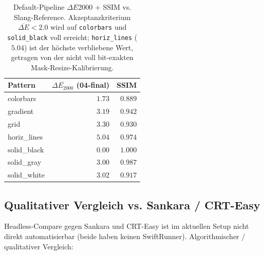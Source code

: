 \documentclass[11pt, a4paper]{article}
\newcommand{\tableheadercolor}{\rowcolor{hkared}}
\newcommand{\thw}[1]{\color{white}\textbf{#1}}  %
\begin{document}
\vspace{.25cm}
\begin{table}[H]
\centering
\small
{}
\begin{tabularx}{\textwidth}{Xrr}
    \toprule
    \tableheadercolor \thw{Pattern} & \thw{$\overline{\Delta E_{2000}}$ (04-final)} & \thw{SSIM} \\
    \midrule
    colorbars   & $1.73$ & $0.889$ \\
    gradient    & $3.19$ & $0.942$ \\
    grid        & $3.30$ & $0.930$ \\
    horiz\_lines & $5.04$ & $0.974$ \\
    solid\_black & $0.00$ & $1.000$ \\
    solid\_gray  & $3.00$ & $0.987$ \\
    solid\_white & $3.02$ & $0.917$ \\
    \bottomrule
\end{tabularx}
 \vspace{.25cm}
\caption{Default-Pipeline $\Delta E$2000 + SSIM vs. Slang-Reference. Akzeptanzkriterium $\overline{\Delta E} < 2.0$ wird auf \texttt{colorbars} und \texttt{solid\_black} voll erreicht; \texttt{horiz\_lines} ($5.04$) ist der h\"ochste verbliebene Wert, getragen von der nicht voll bit-exakten Mask-Resize-Kalibrierung.}
\end{table}

\vspace{.5cm}
\subsection{Qualitativer Vergleich vs. Sankara / CRT-Easy}
\vspace{.25cm}

Headless-Compare gegen Sankara und CRT-Easy ist im aktuellen Setup nicht direkt automatisierbar (beide haben keinen Swift\-Runner). Algorithmischer / qualitativer Vergleich:
\end{document}
